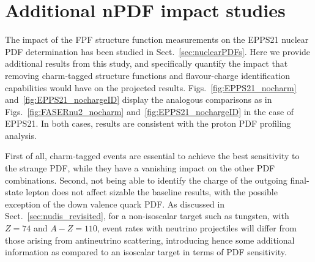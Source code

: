 \section{Additional nPDF impact studies}
\label{app:nPDF_impact_appendix}

The impact of the FPF structure function measurements on the
EPPS21 nuclear PDF determination has been studied in Sect.~\ref{sec:nuclearPDFs}.
%
Here we provide additional results from this study, and specifically quantify the impact
that removing charm-tagged structure functions and flavour-charge
identification capabilities would have on the projected results.
%
Figs.~\ref{fig:EPPS21_nocharm} and~\ref{fig:EPPS21_nochargeID} display
the analogous comparisons as in Figs.~\ref{fig:FASERnu2_nocharm}
and~\ref{fig:EPPS21_nochargeID} in the case of EPPS21.
%
In both cases, results are consistent with the proton PDF profiling analysis.

First of all, charm-tagged events are essential to achieve the best
sensitivity to the strange PDF, while they have a vanishing impact on the
other PDF combinations.
%
Second, not being able to identify the charge of the outgoing final-state lepton
does not affect sizable the baseline results, with the possible exception
of the down valence quark PDF.
%
As discussed in Sect.~\ref{sec:nudis_revisited}, for a non-isoscalar target
such as tungsten, with $Z=74$ and $A-Z=110$, event rates with neutrino projectiles
will differ from those arising from antineutrino scattering, introducing
hence some additional information as compared to an isoscalar target in terms
of PDF sensitivity.

